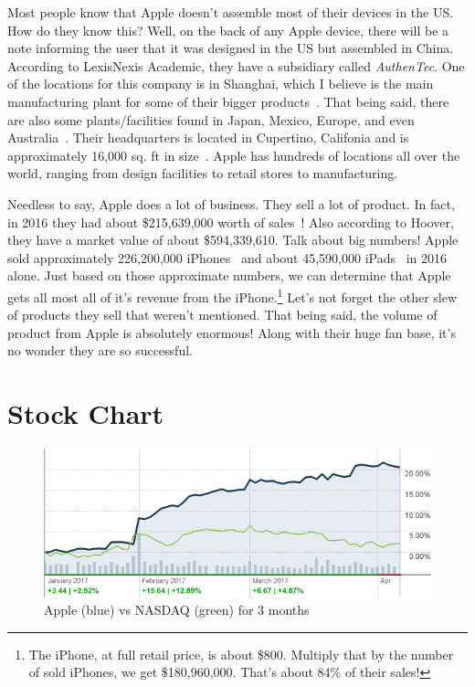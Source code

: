 \documentclass[12pt,a4paper,titlepage]{article}
\begin{document}
Most people know that Apple doesn't assemble most of their devices in the
US. How do they know this? Well, on the back of any Apple device, there will be
a note informing the user that it was designed in the US but assembled in
China. According to LexisNexis Academic, they have a subsidiary called
\emph{AuthenTec}. One of the locations for this company is in Shanghai, which I
believe is the main manufacturing plant for some of their bigger
products~\cite{lexis}. That being said, there are also some plants/facilities
found in Japan, Mexico, Europe, and even Australia~\cite{lexis}. Their
headquarters is located in Cupertino, Califonia and is approximately 16,000
sq. ft in size~\cite{hoover}. Apple has hundreds of locations all over the
world, ranging from design facilities to retail stores to manufacturing.

Needless to say, Apple does a lot of business. They sell a lot of product. In
fact, in 2016 they had about \$215,639,000 worth of sales~\cite{hoover}!
Also according to Hoover, they have a market value of about
\$594,339,610. Talk about big numbers! Apple sold approximately 226,200,000
iPhones~\cite{lifewire} and about 45,590,000 iPads~\cite{lifewire2} in 2016
alone. Just based on those approximate numbers, we can determine that Apple gets
all most all of it's revenue from the iPhone.\footnote{The iPhone, at full
  retail price, is about \$800. Multiply that by the number of sold iPhones, we
  get \$180,960,000. That's about 84\% of their sales!} Let's not forget the
other slew of products they sell that weren't mentioned. That being said, the
volume of product from Apple is absolutely enormous! Along with their huge fan
base, it's no wonder they are so successful.

\newpage

\section{Stock Chart}

\begin{figure}[!htb]
  \centering
  \includegraphics[width=1\textwidth]{apple-chart-3mo}
    \caption{Apple (blue) vs NASDAQ (green) for 3 months~\cite{cnnapple}}
\end{figure}
\end{document}
